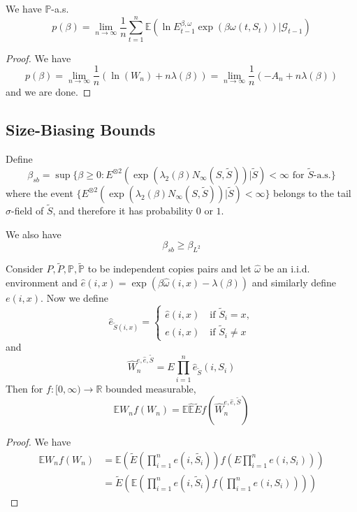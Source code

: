 \begin{corollary}
    We have $\mathbb{P}$-a.s.
    \[
    p(\beta) = \lim_{n\to\infty}\dfrac{1}{n}\sum\limits_{t=1}^n \mathbb{E}(\ln E_{t-1}^{\beta,\omega}\exp{(\beta\omega(t,S_t))}|\mathcal{G}_{t-1})
    \]
\end{corollary}
\begin{proof}
    We have
    \[
    p(\beta) = \lim_{n\to\infty}\dfrac{1}{n} (\ln(W_n) + n\lambda(\beta)) = \lim_{n\to\infty}\dfrac{1}{n}(-A_n + n\lambda(\beta))
    \]
    and we are done.
\end{proof}

\subsection{Size-Biasing Bounds}

\begin{definition}
    Define
    \[
    \beta_{sb} = \sup\{\beta \geq 0: E^{\otimes 2}(\exp(\lambda_2(\beta)N_{\infty}(S,\tilde{S}))|\tilde{S}) < \infty\text{ for }\tilde{S}\text{-a.s.}\}
    \]
    where the event $\{ E^{\otimes 2}(\exp(\lambda_2(\beta)N_{\infty}(S,\tilde{S}))|\tilde{S}) < \infty\}$ belongs to the tail $\sigma$-field of $\tilde{S}$, and therefore it has probability $0$ or $1$.\par
    We also have
    \[\beta_{sb} \geq \beta_{L^2}\]
\end{definition}

\begin{proposition}
    Consider $P,\tilde{P},\mathbb{P},\tilde{\mathbb{P}}$ to be independent copies pairs and let $\hat{\omega}$ be an i.i.d. environment and $\hat{e}(i,x) = \exp(\beta\hat{\omega}(i,x) - \lambda(\beta))$ and similarly define $e(i,x)$. Now we define
    \[
    \hat{e}_{\tilde{S}(i,x)} = \begin{cases}
        \hat{e}(i,x)\quad\text{if }\tilde{S}_i = x,\\
        e(i,x)\quad\text{if }\tilde{S}_i \neq x
    \end{cases}
    \]
    and
    \[
    \hat{W}_n^{e,\hat{e},\tilde{S}} = E\prod_{i=1}^n \hat{e}_{\tilde{S}}(i,S_i)
    \]
    Then for $f:[0,\infty) \to \mathbb{R}$ bounded measurable,
    \[
    \mathbb{E} W_nf(W_n) = \mathbb{E}\hat{\mathbb{E}} \tilde{E}f( \hat{W}_n^{e,\hat{e},\tilde{S}})
    \]
\end{proposition}
\begin{proof}
    We have
    \[
    \begin{aligned}
        \mathbb{E}W_n f(W_n) &= \mathbb{E}\left(\tilde{E}\left(\prod_{i=1}^n e(i,\tilde{S_i})\right)f\left(E\prod_{i=1}^n e(i,S_i)\right)\right) \\
        & = \tilde{E}\left(\mathbb{E}\left(\prod_{i=1}^n e(i,\tilde{S}_i) f\left(\prod_{i=1}^n e(i,S_i)\right)\right)\right)
    \end{aligned}
    \]
\end{proof}

